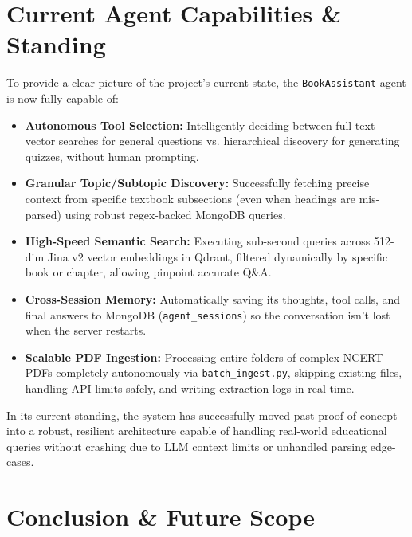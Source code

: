 \documentclass[12pt, a4paper]{article}
\begin{document}
\section{Current Agent Capabilities \& Standing}
To provide a clear picture of the project's current state, the \texttt{BookAssistant} agent is now fully capable of:
\begin{itemize}[label=\(\bullet\)]
    \item \textbf{Autonomous Tool Selection:} Intelligently deciding between full-text vector searches for general questions vs. hierarchical discovery for generating quizzes, without human prompting.
    \item \textbf{Granular Topic/Subtopic Discovery:} Successfully fetching precise context from specific textbook subsections (even when headings are mis-parsed) using robust regex-backed MongoDB queries.
    \item \textbf{High-Speed Semantic Search:} Executing sub-second queries across 512-dim Jina v2 vector embeddings in Qdrant, filtered dynamically by specific book or chapter, allowing pinpoint accurate Q\&A.
    \item \textbf{Cross-Session Memory:} Automatically saving its thoughts, tool calls, and final answers to MongoDB (\texttt{agent\_sessions}) so the conversation isn't lost when the server restarts.
    \item \textbf{Scalable PDF Ingestion:} Processing entire folders of complex NCERT PDFs completely autonomously via \texttt{batch\_ingest.py}, skipping existing files, handling API limits safely, and writing extraction logs in real-time.
\end{itemize}
In its current standing, the system has successfully moved past proof-of-concept into a robust, resilient architecture capable of handling real-world educational queries without crashing due to LLM context limits or unhandled parsing edge-cases.

\section{Conclusion \& Future Scope}
\end{document}
